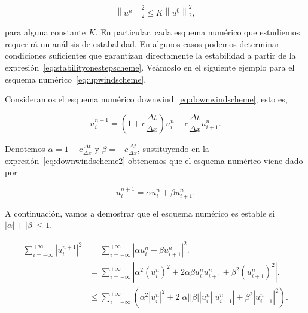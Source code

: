 \begin{equation}\label{eq:stabilityonestepschemeequivalence}
  {\left\|u^{n}\right\|}^{2}_{2}\leq
  K
  {\left\|u^{0}\right\|}^{2}_{2},
\end{equation}

para alguna constante $K$.
En particular, cada esquema numérico que estudiemos requerirá
un análisis de estabalidad. En algunos casos podemos determinar
condiciones suficientes que garantizan directamente la estabilidad a
partir de la expresión~\eqref{eq:stabilityonestepscheme}.
Veámoslo en el siguiente ejemplo para el esquema
numérico~\eqref{eq:upwindscheme}.

\begin{example}
  Consideramos el esquema numérico
  downwind~\eqref{eq:downwindscheme}, esto es,

  \begin{equation}\label{eq:downwindscheme2}
    u^{n+1}_{i}=
    \left(
    1+
    c\frac{\Delta t}{\Delta x}
    \right)
    u^{n}_{i}-
    c\frac{\Delta t}{\Delta x}
    u^{n}_{i+1}.
  \end{equation}

  Denotemos
  \begin{math}
    \alpha=
    1+
    c\frac{\Delta t}{\Delta x}
  \end{math}
  y
  \begin{math}
    \beta=
    -c\frac{\Delta t}{\Delta x}
  \end{math},
  sustituyendo en la expresión~\eqref{eq:downwindscheme2} obtenemos
  que el esquema numérico viene dado por

  \begin{equation*}
    u^{n+1}_{i}=
    \alpha u^{n}_{i}+
    \beta u^{n}_{i+1}.
  \end{equation*}

  A continuación, vamos a demostrar que el esquema numérico es
  estable si
  \begin{math}
    \left|\alpha\right|+
    \left|\beta\right|\leq
    1
  \end{math}.

  \begin{align*}
    \sum_{i=-\infty}^{+\infty}
    {\left|u^{n+1}_{i}\right|}^{2} & =
    \sum_{i=-\infty}^{+\infty}
    {
    \left|\alpha u^{n}_{i}+
    \beta u^{n}_{i+1}\right|
    }^{2}.                                \\
                                   & =
    \sum_{i=-\infty}^{+\infty}
    \left|
    \alpha^{2}
    {\left(u^{n}_{i}\right)}^{2}+
    2\alpha\beta
    u^{n}_{i}
    u^{n}_{i+1}+
    \beta^{2}
    {\left(u^{n}_{i+1}\right)}^{2}
    \right|.                              \\
                                   & \leq
    \sum_{i=-\infty}^{+\infty}
    \left(
    \alpha^{2}
    {\left|u^{n}_{i}\right|}^{2}+
    2\left|\alpha\right|
    \left|\beta\right|
    \left|u^{n}_{i}\right|
    \left|u^{n}_{i+1}\right|+
    \beta^{2}
    {\left|u^{n}_{i+1}\right|}^{2}
    \right).
  \end{align*}


\end{example}
